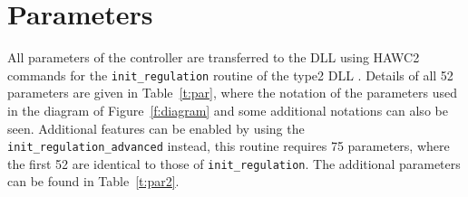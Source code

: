 \section{Parameters}
\label{s:par}

All parameters of the controller are transferred to the DLL using HAWC2 commands for the \verb|init_regulation| routine of the type2 DLL \cite{Larsen12}. Details of all 52 parameters are given in Table~\ref{t:par}, where the notation of the parameters used in the diagram of Figure~\ref{f:diagram} and some additional notations can also be seen. Additional features can be enabled by using the \verb|init_regulation_advanced| instead, this routine requires 75 parameters, where the first 52 are identical to those of \verb|init_regulation|. The additional parameters can be found in Table~\ref{t:par2}.

